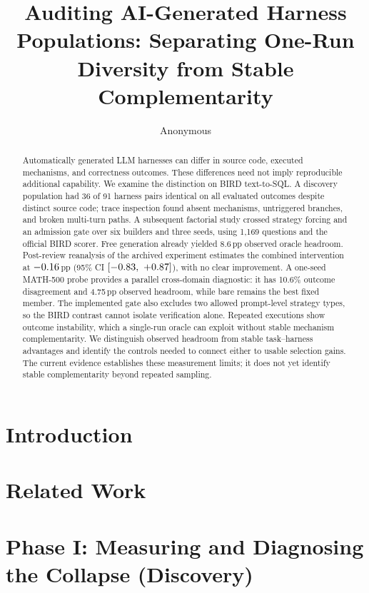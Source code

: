 \documentclass{article}
\title{Auditing AI-Generated Harness Populations: Separating One-Run Diversity from Stable Complementarity}
\author{Anonymous}
\begin{document}
\maketitle

\begin{abstract}
Automatically generated LLM harnesses can differ in source code, executed
mechanisms, and correctness outcomes. These differences need not imply
reproducible additional capability. We examine the distinction on BIRD
text-to-SQL. A discovery population had 36 of 91 harness pairs identical on
all evaluated outcomes despite distinct source code; trace inspection found
absent mechanisms, untriggered branches, and broken multi-turn paths.
A subsequent factorial study crossed strategy forcing and an admission gate
over six builders and three seeds, using 1{,}169 questions and the official
BIRD scorer. Free generation already yielded 8.6\,pp observed oracle
headroom. Post-review reanalysis of the archived experiment estimates the
combined intervention at $-0.16$\,pp (95\% CI
$[-0.83,\ +0.87]$), with no clear improvement. A one-seed MATH-500
probe provides a parallel cross-domain diagnostic: it has 10.6\% outcome
disagreement and 4.75\,pp observed headroom, while bare remains the best
fixed member. The implemented gate also excludes two allowed prompt-level
strategy types, so the BIRD contrast cannot isolate verification alone.
Repeated executions show outcome instability, which a single-run oracle can
exploit without stable mechanism complementarity. We distinguish observed headroom from stable task--harness
advantages and identify the controls needed to connect either to usable
selection gains. The current evidence establishes these measurement limits;
it does not yet identify stable complementarity beyond repeated sampling.
\end{abstract}

\section{Introduction}\label{sec:introduction}


\section{Related Work}\label{sec:related}


\section{Phase I: Measuring and Diagnosing the Collapse (Discovery)}\label{sec:phase1}

\end{document}
